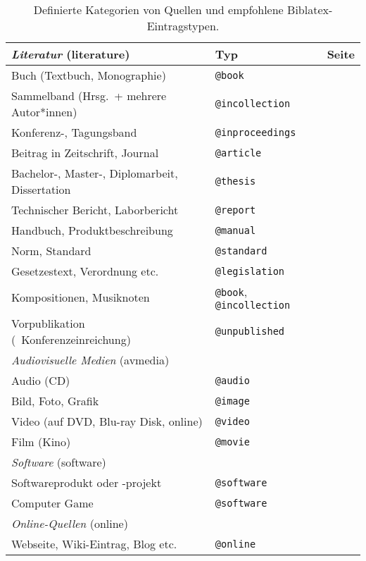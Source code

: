 \begin{table}
\caption{Definierte Kategorien von Quellen und empfohlene Biblatex-Eintragstypen.}
\label{tab:QuellenUndEintragstypen}
\centering
\begin{tabular}{@{}llc@{}}
	\toprule
	\emph{Literatur} (\textsf{literature}) & Typ & Seite\\
	\midrule
	Buch (Textbuch, Monographie) & \texttt{@book} & \pageref{sec:@book}\\
	Sammelband (Hrsg.\ + mehrere Autor*innen) & \texttt{@incollection} & \pageref{sec:@incollection} \\
	Konferenz-, Tagungsband & \texttt{@inproceedings} & \pageref{sec:@inproceedings}\\
	Beitrag in Zeitschrift, Journal & \texttt{@article} & \pageref{sec:@article}\\
	Bachelor-, Master-, Diplomarbeit, Dissertation & \texttt{@thesis} & \pageref{sec:@thesis}\\
	Technischer Bericht, Laborbericht & \texttt{@report} & \pageref{sec:@report}\\
	Handbuch, Produktbeschreibung & \texttt{@manual} & \pageref{sec:@manual}\\
	Norm, Standard & \texttt{@standard} & \pageref{sec:@standard}\\
	Gesetzestext, Verordnung etc. & \texttt{@legislation} & \pageref{sec:@legislation}\\
	Kompositionen, Musiknoten & \texttt{@book}, \texttt{@incollection} & \pageref{sec:Musiknoten}\\
	Vorpublikation (\zB\ Konferenzeinreichung) & \texttt{@unpublished} & \pageref{sec:@unpublished}\\
	\addlinespace
%
	\midrule
	\emph{Audiovisuelle Medien} (\textsf{avmedia}) & & \\
	\midrule
	Audio (CD) & \texttt{@audio} & \pageref{sec:@audio}\\
	Bild, Foto, Grafik & \texttt{@image} & \pageref{sec:@image}\\
	Video (auf DVD, Blu-ray Disk, online) & \texttt{@video} & \pageref{sec:@video}\\
	Film (Kino) & \texttt{@movie} & \pageref{sec:@movie}\\
	\addlinespace
%
	\midrule
	\emph{Software} (\textsf{software}) & & \\
	\midrule
	Softwareprodukt oder -projekt & \texttt{@software} & \pageref{sec:@software}\\
	Computer Game & \texttt{@software} & \pageref{sec:@software}\\
	\addlinespace
%
	\midrule
	\emph{Online-Quellen} (\textsf{online}) & & \\
	\midrule
	Webseite, Wiki-Eintrag, Blog etc. & \texttt{@online} & \pageref{sec:@online-www} \\
	\bottomrule
\end{tabular}
\end{table}


